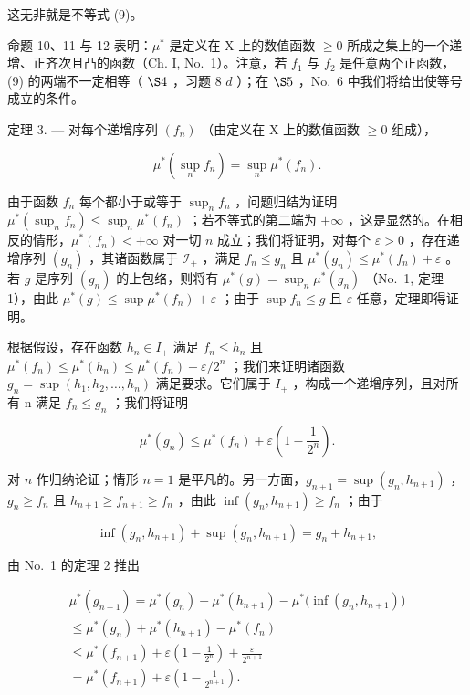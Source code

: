 这无非就是不等式 (9)。

命题 10、11 与 12 表明：\(\mu^{*}\) 是定义在 X 上的数值函数 \(\geqslant 0\) 所成之集上的一个递增、正齐次且凸的函数（Ch. I, No.~1）。注意，若 \(f_{1}\) 与 \(f_{2}\) 是任意两个正函数，(9) 的两端不一定相等（ \(\S 4\) ，习题 8 \(d\) ）；在 \(\S 5\) ，No.~6 中我们将给出使等号成立的条件。

定理 3. --- 对每个递增序列 \((f_{n})\) （由定义在 X 上的数值函数 \(\geqslant 0\) 组成），

\[
\mu^ {*} \left(\sup _ {n} f _ {n}\right) = \sup _ {n} \mu^ {*} (f _ {n}).\tag{10}
\]

由于函数 \(f_n\) 每个都小于或等于 \(\sup_{n} f_n\) ，问题归结为证明 \(\mu^*(\sup_{n} f_n) \leqslant \sup_{n} \mu^*(f_n)\) ；若不等式的第二端为 \(+\infty\) ，这是显然的。在相反的情形，\(\mu^*(f_n) < +\infty\) 对一切 \(n\) 成立；我们将证明，对每个 \(\varepsilon > 0\) ，存在递增序列 \((g_n)\) ，其诸函数属于 \(\mathcal{I}_+\) ，满足 \(f_n \leqslant g_n\) 且 \(\mu^*(g_n) \leqslant \mu^*(f_n) + \varepsilon\) 。若 \(g\) 是序列 \((g_n)\) 的上包络，则将有 \(\mu^*(g) = \sup_n \mu^*(g_n)\) （No.~1, 定理 1），由此 \(\mu^*(g) \leqslant \sup \mu^*(f_n) + \varepsilon\) ；由于 \(\sup f_n \leqslant g\) 且 \(\varepsilon\) 任意，定理即得证明。

根据假设，存在函数 \(h_{n} \in I_{+}\) 满足 \(f_{n} \leqslant h_{n}\) 且 \(\mu^{*}(f_{n}) \leqslant \mu^{*}(h_{n}) \leqslant \mu^{*}(f_{n}) + \varepsilon/2^{n}\) ；我们来证明诸函数 \(g_{n} = \sup(h_{1}, h_{2}, \ldots, h_{n})\) 满足要求。它们属于 \(I_{+}\) ，构成一个递增序列，且对所有 n 满足 \(f_{n} \leqslant g_{n}\) ；我们将证明

\[
\mu^ {*} (g _ {n}) \leqslant \mu^ {*} (f _ {n}) + \varepsilon \left(1 - \frac {1}{2 ^ {n}}\right).
\]

对 \(n\) 作归纳论证；情形 \(n = 1\) 是平凡的。另一方面，\(g_{n+1} = \sup(g_n, h_{n+1})\) ，\(g_n \geqslant f_n\) 且 \(h_{n+1} \geqslant f_{n+1} \geqslant f_n\) ，由此 \(\inf(g_n, h_{n+1}) \geqslant f_n\) ；由于

\[
\inf (g _ {n}, h _ {n + 1}) + \sup (g _ {n}, h _ {n + 1}) = g _ {n} + h _ {n + 1},
\]

由 No.~1 的定理 2 推出

\[
\begin{array}{l} \mu^ {*} (g _ {n + 1}) = \mu^ {*} (g _ {n}) + \mu^ {*} (h _ {n + 1}) - \mu^ {*} \big (\inf (g _ {n}, h _ {n + 1}) \big) \\ \leqslant \mu^ {*} (g _ {n}) + \mu^ {*} (h _ {n + 1}) - \mu^ {*} (f _ {n}) \\ \leqslant \mu^ {*} (f _ {n + 1}) + \varepsilon \left(1 - \frac {1}{2 ^ {n}}\right) + \frac {\varepsilon}{2 ^ {n + 1}} \\ = \mu^ {*} (f _ {n + 1}) + \varepsilon \left(1 - \frac {1}{2 ^ {n + 1}}\right). \end{array}\tag{Q.E.D.}
\]

